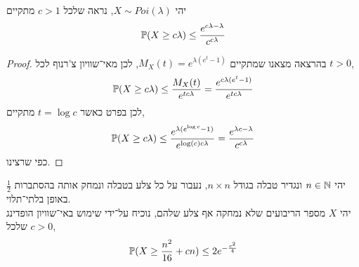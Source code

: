 \question{}
יהי $X \sim Poi(\lambda)$,
נראה שלכל $c > 1$ מתקיים
\[
	\mathbb{P}(X \ge c \lambda)
	\le \frac{e^{c\lambda - \lambda}}{c^{c\lambda}}
\]
\begin{proof}
	בהרצאה מצאנו שמתקיים $M_X(t) = e^{\lambda(e^t - 1)}$, לכן מאי־שוויון צ'רנוף לכל $t > 0$,
	\[
		\mathbb{P}(X \ge c \lambda)
		\le \frac{M_X(t)}{e^{t c \lambda}}
		= \frac{e^{c\lambda (e^t - 1)}}{e^{t c \lambda}}
	\]
	לכן בפרט כאשר $t = \log c$ מתקיים,
	\[
		\mathbb{P}(X \ge c \lambda)
		\le \frac{e^{\lambda (e^{\log c} - 1)}}{e^{\log(c) c \lambda}}
		= \frac{e^{\lambda c - \lambda}}{c^{c \lambda}}
	\]
	כפי שרצינו.
\end{proof}

\question{}
יהי $n \in \mathbb{N}$ ונגדיר טבלה בגודל $n \times n$, נעבור על כל צלע בטבלה ונמחק אותה בהסתברות $\frac{1}{2}$ באופן בלתי־תלוי. \\
יהי $X$ מספר הריבועים שלא נמחקה אף צלע שלהם, נוכיח על־ידי שימוש באי־שוויון הופדינג שלכל $c > 0$,
\[
	\mathbb{P}(X \ge \frac{n^2}{16} + cn) \le 2 e^{-\frac{c^2}{4}}
\]
